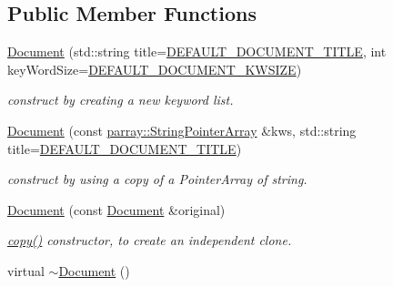 \subsection*{Public Member Functions}
\begin{DoxyCompactItemize}
\item 
\hypertarget{classdocs_1_1Document_ace8d18f691181e1676a6ca5207da336b}{\hyperlink{classdocs_1_1Document_ace8d18f691181e1676a6ca5207da336b}{Document} (std\-::string title=\hyperlink{namespacedocs_a4cf6dd6732c7e7ab7f7855e440485d89}{D\-E\-F\-A\-U\-L\-T\-\_\-\-D\-O\-C\-U\-M\-E\-N\-T\-\_\-\-T\-I\-T\-L\-E}, int key\-Word\-Size=\hyperlink{namespacedocs_ae635b9481a61628036b5a97625856475}{D\-E\-F\-A\-U\-L\-T\-\_\-\-D\-O\-C\-U\-M\-E\-N\-T\-\_\-\-K\-W\-S\-I\-Z\-E})}\label{classdocs_1_1Document_ace8d18f691181e1676a6ca5207da336b}

\begin{DoxyCompactList}\small\item\em construct by creating a new keyword list. \end{DoxyCompactList}\item 
\hypertarget{classdocs_1_1Document_aa9c1a4e9b6aab58e8e28b16a2888e601}{\hyperlink{classdocs_1_1Document_aa9c1a4e9b6aab58e8e28b16a2888e601}{Document} (const \hyperlink{classparray_1_1StringPointerArray}{parray\-::\-String\-Pointer\-Array} \&kws, std\-::string title=\hyperlink{namespacedocs_a4cf6dd6732c7e7ab7f7855e440485d89}{D\-E\-F\-A\-U\-L\-T\-\_\-\-D\-O\-C\-U\-M\-E\-N\-T\-\_\-\-T\-I\-T\-L\-E})}\label{classdocs_1_1Document_aa9c1a4e9b6aab58e8e28b16a2888e601}

\begin{DoxyCompactList}\small\item\em construct by using a copy of a Pointer\-Array of string. \end{DoxyCompactList}\item 
\hypertarget{classdocs_1_1Document_ad65291ea47b0be5a29d2ba13868a8a7c}{\hyperlink{classdocs_1_1Document_ad65291ea47b0be5a29d2ba13868a8a7c}{Document} (const \hyperlink{classdocs_1_1Document}{Document} \&original)}\label{classdocs_1_1Document_ad65291ea47b0be5a29d2ba13868a8a7c}

\begin{DoxyCompactList}\small\item\em \hyperlink{classdocs_1_1Document_ad8b6a91c7a8e39a880790d14aba14322}{copy()} constructor, to create an independent clone. \end{DoxyCompactList}\item 
\hypertarget{classdocs_1_1Document_abcb73ac5ddf4e7b0c862220228b85b9e}{virtual \hyperlink{classdocs_1_1Document_abcb73ac5ddf4e7b0c862220228b85b9e}{$\sim$\-Document} ()}\label{classdocs_1_1Document_abcb73ac5ddf4e7b0c862220228b85b9e}


\end{DoxyCompactItemize}
